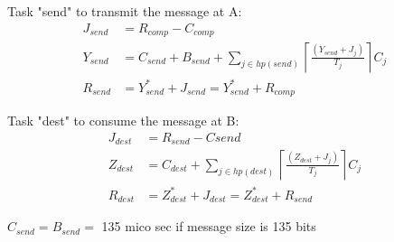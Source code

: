 Task "send" to transmit the message at A:
\begin{align*}
  J_{send} &= R_{comp} - C_{comp} \\
  Y_{send} &= C_{send} + B_{send} + \sum_{j\in hp(send)} \left\lceil \frac{(Y_{send} + J_j)}{T_j} \right\rceil C_j \\
  R_{send} &= Y_{send}^* + J_{send} = Y_{send}^* + R_{comp}
\end{align*}

Task "dest" to consume the message at B:
\begin{align*}
  J_{dest} &= R_{send} - C{send} \\
  Z_{dest} &= C_{dest} + \sum_{j\in hp(dest)} \left\lceil \frac{(Z_{dest} + J_j)}{T_j} \right\rceil C_j \\
  R_{dest} &= Z_{dest}^* + J_{dest} = Z_{dest}^* + R_{send}
\end{align*}

$C_{send}=B_{send}=$ 135 mico sec if message size is 135 bits